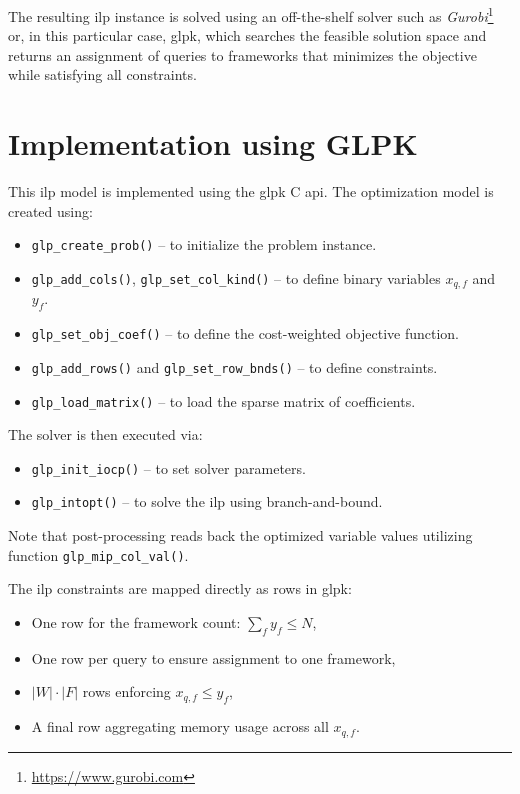 The resulting \acrshort{ilp} instance is solved using an off-the-shelf solver such as \emph{Gurobi}\footnote{\url{https://www.gurobi.com}} or, in this particular case, \acrshort{glpk}, which searches the feasible solution space and returns an assignment of queries to frameworks that minimizes the objective while satisfying all constraints.

\section{Implementation using GLPK}

This \acrshort{ilp} model is implemented using the \acrshort{glpk} C \acrshort{api}. The optimization model is created using:

\begin{itemize}
    \item \texttt{glp\_create\_prob()} -- to initialize the problem instance.
    \item \texttt{glp\_add\_cols()}, \texttt{glp\_set\_col\_kind()} -- to define binary variables $x_{q,f}$ and $y_f$.
    \item \texttt{glp\_set\_obj\_coef()} -- to define the cost-weighted objective function.
    \item \texttt{glp\_add\_rows()} and \texttt{glp\_set\_row\_bnds()} -- to define constraints.
    \item \texttt{glp\_load\_matrix()} -- to load the sparse matrix of coefficients.
\end{itemize}

The solver is then executed via:
\begin{itemize}
    \item \texttt{glp\_init\_iocp()} -- to set solver parameters.
    \item \texttt{glp\_intopt()} -- to solve the \acrshort{ilp} using branch-and-bound.
\end{itemize}

Note that post-processing reads back the optimized variable values utilizing function \texttt{glp\_mip\_col\_val()}.

The \acrshort{ilp} constraints are mapped directly as rows in \acrshort{glpk}:

\begin{itemize}
    \item One row for the framework count: $\sum_f y_f \leq N$,
    \item One row per query to ensure assignment to one framework,
    \item $|W| \cdot |F|$ rows enforcing $x_{q,f} \leq y_f$,
    \item A final row aggregating memory usage across all $x_{q,f}$.
\end{itemize}

